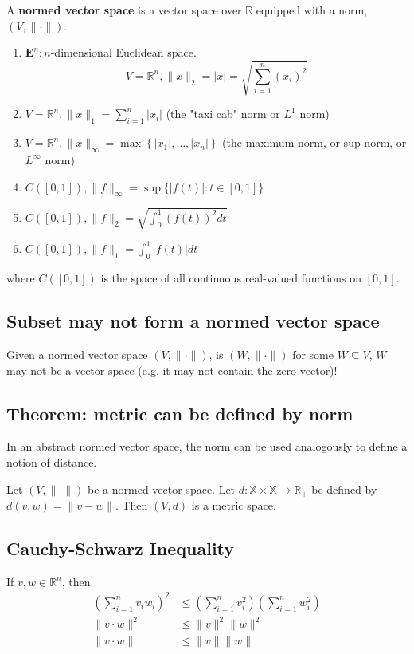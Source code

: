 \documentclass[11pt]{elegantbook}
\begin{document}
\begin{definition}
\normalfont
    A \textbf{normed vector space} is a vector space over $\mathbb{R}$ equipped with a norm, $(V,\|\cdot\|)$.
\end{definition}
\begin{example}
\begin{enumerate}[-]
    \item $\mathbf{E}^n: n$-dimensional Euclidean space.
    $$
    V=\mathbb{R}^n,\|x\|_2=|x|=\sqrt{\sum_{i=1}^n\left(x_i\right)^2}
    $$
    \item $V=\mathbb{R}^n,\|x\|_1=\sum_{i=1}^n\left|x_i\right|$ (the "taxi cab" norm or $L^1$ norm)
    \item $V=\mathbb{R}^n,\|x\|_{\infty}=\max \left\{\left|x_1\right|, \ldots,\left|x_n\right|\right\}$ (the maximum norm, or sup norm, or $L^{\infty}$ norm)
    \item $C([0,1]),\|f\|_{\infty}=\sup \{|f(t)|: t \in[0,1]\}$
    \item $C([0,1]),\|f\|_2=\sqrt{\int_0^1(f(t))^2 d t}$
    \item $C([0,1]),\|f\|_1=\int_0^1|f(t)| d t$
\end{enumerate}
where $C([0,1])$ is the space of all continuous real-valued functions on $[0,1]$.
\end{example}

\subsection{Subset may not form a normed vector space}
Given a normed vector space $(V, \|\cdot\|)$, is $(W, \|\cdot\|)$ for some $W \subseteq V$, $W$ may not be a vector space (e.g. it may not contain the zero vector)!

\subsection{Theorem: metric can be defined by norm}
In an abstract normed vector space, the norm can be used analogously to define a notion of distance.
\begin{theorem}
    Let $(V,\|\cdot\|)$ be a normed vector space. Let $d : \mathbb{X} \times \mathbb{X} \rightarrow \mathbb{R}_+$ be defined by $d(v, w) = \|v-w\|$. Then $(V, d)$ is a metric space.
\end{theorem}

\subsection{Cauchy-Schwarz Inequality}
\begin{theorem}
    If $v, w \in \mathbb{R}^n$, then
    $$
    \begin{aligned}
    \left(\sum_{i=1}^n v_i w_i\right)^2 & \leq\left(\sum_{i=1}^n v_i^2\right)\left(\sum_{i=1}^n w_i^2\right) \\
    \|v \cdot w\|^2 & \leq\|v\|^2\|w\|^2 \\
    \|v \cdot w\| & \leq\|v\|\|w\|
    \end{aligned}
    $$
\end{theorem}
\end{document}
